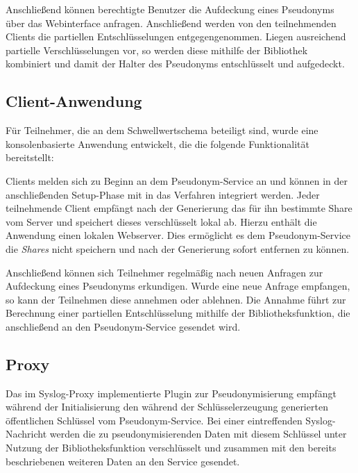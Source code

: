 

Anschließend können berechtigte Benutzer die Aufdeckung eines Pseudonyms über das Webinterface anfragen. Anschließend werden von den teilnehmenden Clients die partiellen Entschlüsselungen entgegengenommen. Liegen ausreichend partielle Verschlüsselungen vor, so werden diese mithilfe der Bibliothek kombiniert und damit der Halter des Pseudonyms entschlüsselt und aufgedeckt. 

\subsection{Client-Anwendung}

%

Für Teilnehmer, die an dem Schwellwertschema beteiligt sind, wurde eine konsolenbasierte Anwendung entwickelt, die die folgende Funktionalität bereitstellt:

Clients melden sich zu Beginn an dem Pseudonym-Service an und können in der anschließenden Setup-Phase mit in das Verfahren integriert werden. Jeder teilnehmende Client empfängt nach der Generierung das für ihn bestimmte Share vom Server und speichert dieses verschlüsselt lokal ab. Hierzu enthält die Anwendung einen lokalen Webserver. Dies ermöglicht es dem Pseudonym-Service die \textit{Shares} nicht speichern und nach der Generierung sofort entfernen zu können. 

Anschließend können sich Teilnehmer regelmäßig nach neuen Anfragen zur Aufdeckung eines Pseudonyms erkundigen. Wurde eine neue Anfrage empfangen, so kann der Teilnehmen diese annehmen oder ablehnen. Die Annahme führt zur Berechnung einer partiellen Entschlüsselung mithilfe der Bibliotheksfunktion, die anschließend an den Pseudonym-Service gesendet wird.

\subsection{Proxy}


Das im Syslog-Proxy implementierte Plugin zur Pseudonymisierung empfängt während der Initialisierung den während der Schlüsselerzeugung generierten öffentlichen Schlüssel vom Pseudonym-Service. Bei einer eintreffenden Syslog-Nachricht werden die zu pseudonymisierenden Daten mit diesem Schlüssel unter Nutzung der Bibliotheksfunktion verschlüsselt und zusammen mit den bereits beschriebenen weiteren Daten an den Service gesendet.